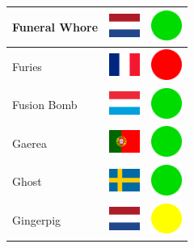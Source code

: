 \documentclass[12pt, a4paper, twoside]{report}
\begin{document}
\begin{center}
\begin{longtable}{|p{5cm}|p{2cm}|p{2cm}|}
Funeral Whore & \includegraphics[width=1cm]{4x3/nl} & \includegraphics[width=1cm]{likes/y} \\ \hline
Furies & \includegraphics[width=1cm]{4x3/fr} & \includegraphics[width=1cm]{likes/n} \\ \hline
Fusion Bomb & \includegraphics[width=1cm]{4x3/lu} & \includegraphics[width=1cm]{likes/y} \\ \hline
Gaerea & \includegraphics[width=1cm]{4x3/pt} & \includegraphics[width=1cm]{likes/y} \\ \hline
Ghost & \includegraphics[width=1cm]{4x3/se} & \includegraphics[width=1cm]{likes/y} \\ \hline
Gingerpig & \includegraphics[width=1cm]{4x3/nl} & \includegraphics[width=1cm]{likes/m} \\ \hline

\end{longtable}
\end{center}
\end{document}
